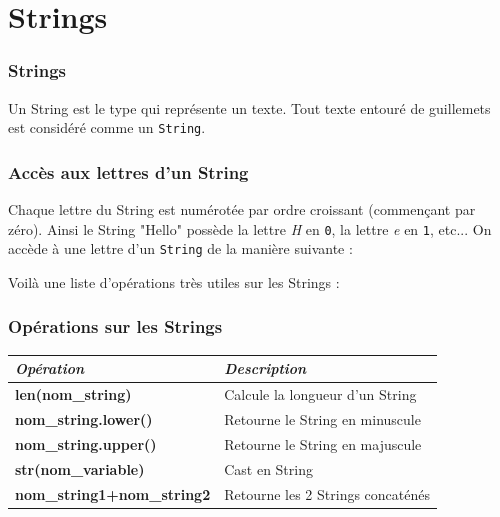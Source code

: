 \documentclass[handout]{beamer}
\begin{document}
\section{Strings}
\begin{frame}
\frametitle{Strings}
Un String est le type qui représente un texte. Tout texte entouré de guillemets est considéré comme un \texttt{String}.
\strin
\end{frame}
\begin{frame}
\frametitle{Accès aux lettres d'un String}
Chaque lettre du String est numérotée par ordre croissant (commençant par zéro). Ainsi le String "Hello" possède la lettre \textit{H} en \texttt{0}, la lettre \textit{e} en \texttt{1}, etc... On accède à une lettre d'un \texttt{String} de la manière suivante :
\access
\end{frame}
\begin{frame}
Voilà une liste d'opérations très utiles sur les Strings :
\frametitle{Opérations sur les Strings}
\begin{center}
\begin{tabularx}{\textwidth}{|X|X|}
\hline
\textbf{\emph{Opération}} & \textit{Description}\\
\hline
\bf len(nom\_string) & Calcule la longueur d'un String \\
\hline
\bf nom\_string.lower() & Retourne le String en minuscule\\
\hline
\bf nom\_string.upper() & Retourne le String en majuscule\\
\hline
\bf str(nom\_variable) & Cast en String\\
\hline
\bf nom\_string1+nom\_string2 & Retourne les 2 Strings concaténés\\
\hline
\end{tabularx}
\end{center}
\end{frame}
\end{document}
